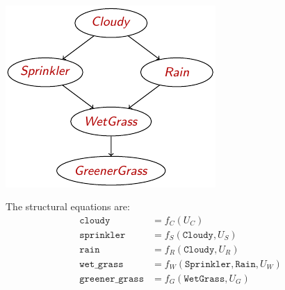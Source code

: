\begin{description}
        \begin{example} \phantom{}\\[0.5em]
            \begin{minipage}{.3\linewidth}
                \centering
                \includegraphics[width=\linewidth]{img/_causal_network_example1.pdf}
            \end{minipage}
            \begin{minipage}{.6\linewidth}
                The structural equations are:
                \[ 
                    \begin{split}
                        \texttt{cloudy} &= f_C(U_C) \\
                        \texttt{sprinkler} &= f_S(\texttt{Cloudy}, U_S) \\
                        \texttt{rain} &= f_R(\texttt{Cloudy}, U_R) \\
                        \texttt{wet\_grass} &= f_W(\texttt{Sprinkler}, \texttt{Rain}, U_W) \\
                        \texttt{greener\_grass} &= f_G(\texttt{WetGrass}, U_G)
                    \end{split}
                \]
            \end{minipage}\\[0.5em]


\end{example}
\end{description}
